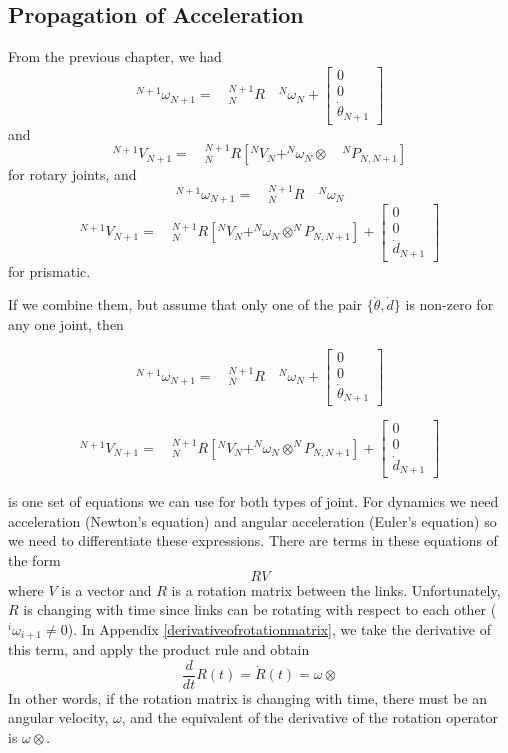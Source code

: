 \subsection{Propagation of Acceleration}
From the previous chapter, we had
\[
^{N+1}\omega_{N+1} = \quad {^{N+1}_{N}R}\quad {^{N}\omega_{N}} +
\left[
\begin{array}{c}
0 \\
0 \\
\dot{\theta}_{N+1}
\end{array}
\right]
\]
and
\[
^{N+1}V_{N+1} =\quad  {^{N+1}_{N}R}\left[
   ^{N}V_{N} +
   ^N\omega_{N} \otimes \quad ^NP_{N,N+1}
   \right]
\]
for rotary joints, and
\[
^{N+1}\omega_{N+1} = \quad {^{N+1}_{N}R}\quad {^{N}\omega_{N}}
\]
\[
^{N+1}V_{N+1} =\quad  {^{N+1}_{N}R}\left[
   ^{N}V_{N} +
   ^{N}\omega_{N} \otimes ^NP_{N,N+1}
   \right] +
\left[
\begin{array}{c}
0 \\
0 \\
\dot{d}_{N+1}
\end{array}
\right]
\]
for prismatic.

If we combine them, but assume that only one of the pair $\{\dot\theta, \dot d\}$ is non-zero for any one joint, then


\[
^{N+1}\omega_{N+1} = \quad {^{N+1}_{N}R}\quad {^{N}\omega_{N}} +
\left[
\begin{array}{c}
0 \\
0 \\
\dot{\theta}_{N+1}
\end{array}
\right]
\]

\[
^{N+1}V_{N+1} =\quad  {^{N+1}_{N}R}\left[
   ^{N}V_{N} +
   ^{N}\omega_{N} \otimes ^NP_{N,N+1}
   \right] +
\left[
\begin{array}{c}
0 \\
0 \\
\dot{d}_{N+1}
\end{array}
\right]
\]

is one set of equations we can use for both types of joint.  For dynamics we need acceleration (Newton's equation) and angular acceleration (Euler's equation) so we need to differentiate these expressions.  There are terms in these equations of the form
\[
RV
\]
where $V$ is a vector and $R$ is a rotation matrix between the links.  Unfortunately, $R$ is changing with time since links can be rotating with respect to each other ($^i\omega_{i+1}\neq 0$). In Appendix \ref{derivativeofrotationmatrix},
 we take the derivative of this term, and apply the product rule and obtain
\[
\frac{d}{dt} R(t) = \dot{R}(t) = \omega\otimes
\]
In other words, if the rotation matrix is changing with time, there must be an angular velocity, $\omega$, and the equivalent of
the derivative of the rotation operator is $\omega\otimes$.

